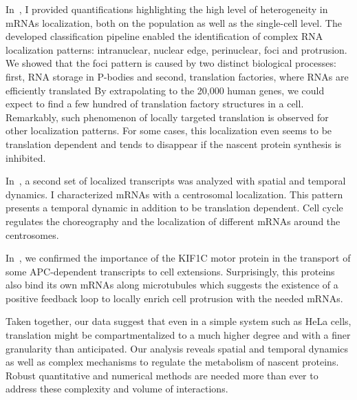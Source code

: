 In~\cite{CHOUAIB_2020}, I provided quantifications highlighting the high level of heterogeneity in \ac{mRNA}s localization, both on the population as well as the single-cell level.
The developed classification pipeline enabled the identification of complex RNA localization patterns: intranuclear, nuclear edge, perinuclear, foci and protrusion.
We showed that the foci pattern is caused by two distinct biological processes: first, RNA storage in \ac{P-bodies} and second, translation factories, where RNAs are efficiently translated
By extrapolating to the 20,000 human genes, we could expect to find a few hundred of translation factory structures in a cell.
Remarkably, such phenomenon of locally targeted translation is observed for other localization patterns.
For some cases, this localization even seems to be translation dependent and tends to disappear if the nascent protein synthesis is inhibited.

In~\cite{safieddine_choreography_2021}, a second set of localized transcripts was analyzed with spatial and temporal dynamics.
I characterized \ac{mRNA}s with a centrosomal localization.
This pattern presents a temporal dynamic in addition to be translation dependent.
Cell cycle regulates the choreography and the localization of different \ac{mRNA}s around the centrosomes.

In~\cite{pichon_kinesin_2021}, we confirmed the importance of the KIF1C motor protein in the transport of some APC-dependent transcripts to cell extensions.
Surprisingly, this proteins also bind its own \ac{mRNA}s along microtubules which suggests the existence of a positive feedback loop to locally enrich cell protrusion with the needed \ac{mRNA}s.

Taken together, our data suggest that even in a simple system such as HeLa cells, translation might be compartmentalized to a much higher degree and with a finer granularity than anticipated.
Our analysis reveals spatial and temporal dynamics as well as complex mechanisms to regulate the metabolism of nascent proteins.
Robust quantitative and numerical methods are needed more than ever to address these complexity and volume of interactions.